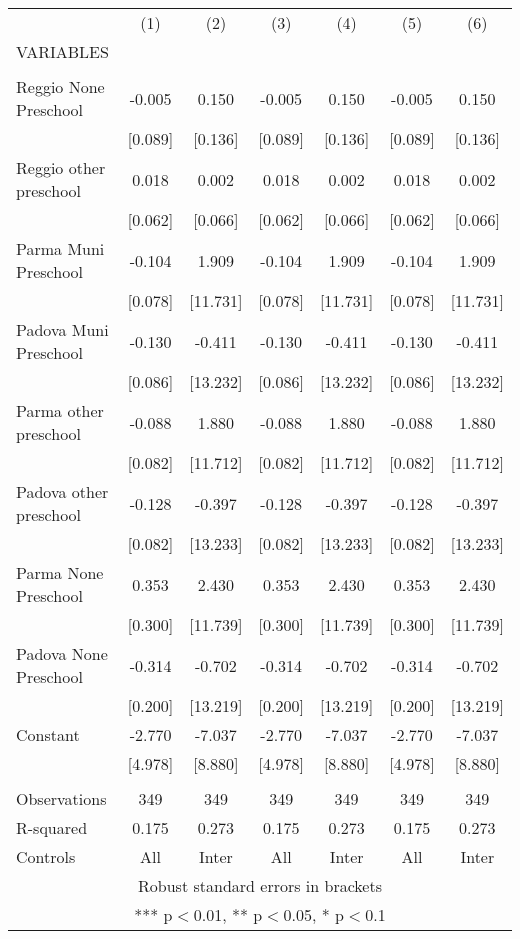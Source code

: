 \begin{tabular}{lcccccc} \hline
 & (1) & (2) & (3) & (4) & (5) & (6) \\
VARIABLES &  &  &  &  &  &  \\ \hline
 &  &  &  &  &  &  \\
Reggio None Preschool & -0.005 & 0.150 & -0.005 & 0.150 & -0.005 & 0.150 \\
 & [0.089] & [0.136] & [0.089] & [0.136] & [0.089] & [0.136] \\
Reggio other preschool & 0.018 & 0.002 & 0.018 & 0.002 & 0.018 & 0.002 \\
 & [0.062] & [0.066] & [0.062] & [0.066] & [0.062] & [0.066] \\
Parma Muni Preschool & -0.104 & 1.909 & -0.104 & 1.909 & -0.104 & 1.909 \\
 & [0.078] & [11.731] & [0.078] & [11.731] & [0.078] & [11.731] \\
Padova Muni Preschool & -0.130 & -0.411 & -0.130 & -0.411 & -0.130 & -0.411 \\
 & [0.086] & [13.232] & [0.086] & [13.232] & [0.086] & [13.232] \\
Parma other preschool & -0.088 & 1.880 & -0.088 & 1.880 & -0.088 & 1.880 \\
 & [0.082] & [11.712] & [0.082] & [11.712] & [0.082] & [11.712] \\
Padova other preschool & -0.128 & -0.397 & -0.128 & -0.397 & -0.128 & -0.397 \\
 & [0.082] & [13.233] & [0.082] & [13.233] & [0.082] & [13.233] \\
Parma None Preschool & 0.353 & 2.430 & 0.353 & 2.430 & 0.353 & 2.430 \\
 & [0.300] & [11.739] & [0.300] & [11.739] & [0.300] & [11.739] \\
Padova None Preschool & -0.314 & -0.702 & -0.314 & -0.702 & -0.314 & -0.702 \\
 & [0.200] & [13.219] & [0.200] & [13.219] & [0.200] & [13.219] \\
Constant & -2.770 & -7.037 & -2.770 & -7.037 & -2.770 & -7.037 \\
 & [4.978] & [8.880] & [4.978] & [8.880] & [4.978] & [8.880] \\
 &  &  &  &  &  &  \\
Observations & 349 & 349 & 349 & 349 & 349 & 349 \\
R-squared & 0.175 & 0.273 & 0.175 & 0.273 & 0.175 & 0.273 \\
 Controls & All & Inter & All & Inter & All & Inter \\ \hline
\multicolumn{7}{c}{ Robust standard errors in brackets} \\
\multicolumn{7}{c}{ *** p$<$0.01, ** p$<$0.05, * p$<$0.1} \\
\end{tabular}
